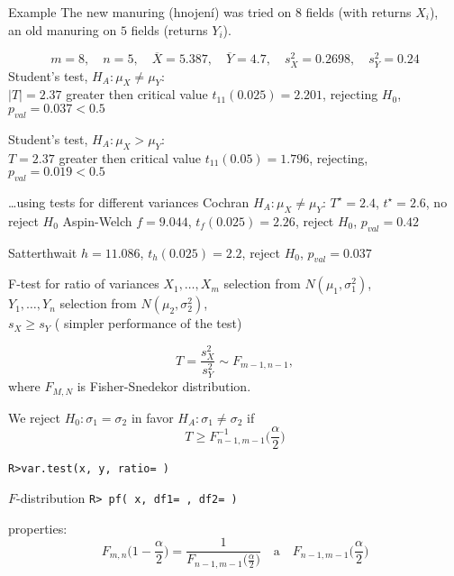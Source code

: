 \documentclass[smaller]{beamer}
\def\abs#1{\lvert#1\rvert}
\def\ol#1{\overline{#1}}
\def\blue#1{{\usebeamercolor[fg]{my blue} #1}}
\def\xskip{{\vspace{2ex}}}
\def\cz#1{{\small (#1)}}
\begin{document}
\begin{frame}{Example}
The new manuring \cz{hnojení} was tried on $8$ fields (with returns $X_i$),\\ 
an old manuring on $5$ fields (returns $Y_i$).

\[
 m=8,\quad n=5,\quad \ol{X}=5.387,\quad \ol{Y}=4.7,\quad s_X^2=0.2698,\quad s_Y^2=0.24
\]
Student's test, $H_A: \mu_X\ne \mu_Y$: \\
$\abs{T}=2.37$ greater then critical value $t_{11}(0.025) =2.201$, rejecting $H_0$, $p_{val} = 0.037 < 0.5$

\xskip
Student's test,  $H_A: \mu_X > \mu_Y$: \\
$T=2.37$ greater then critical value $t_{11}(0.05) =1.796$, rejecting, $p_{val} = 0.019 < 0.5$
\end{frame}

\begin{frame}{\dots using tests for different variances}
Cochran $H_A:  \mu_X\ne \mu_Y$:
$T^{\star} = 2.4$, $t^{\star} = 2.6$, no reject $H_0$
\xskip
Aspin-Welch $f=9.044$, $t_f(0.025) = 2.26$, reject $H_0$, $p_{val} = 0.42$

\xskip
Satterthwait $h=11.086$, $t_h(0.025) =2.2$, reject $H_0$, $p_{val} = 0.037 $

\end{frame}




\begin{frame}[fragile]{F-test for ratio of variances }
$X_1, \dots ,X_m$ selection from $N(\mu_1,\sigma_1^2)$,\\
$Y_1, \dots ,Y_n$ selection from  $N(\mu_2,\sigma_2^2)$,\\
$s_X \ge s_Y$ ( simpler performance of the test)

\[
  T=\frac{s_X^2}{s_Y^2} \sim F_{m-1,n-1},
\]
where $F_{M,N}$ is  Fisher-Snedekor distribution.

We reject $H_0:\sigma_1 = \sigma_2$ in favor  $H_A: \sigma_1\ne\sigma_2$ if 
\[
  T \ge F^{-1}_{n-1,m-1}\Big(\frac{\alpha}{2}\Big)
\]

\verb'R>var.test(x, y, ratio= )'
\end{frame}

\begin{frame}[fragile]{$F$-distribution}
\verb'R> pf( x, df1= , df2= )'

\xskip
\blue{properties:}
\[
 F_{m,n}\Big(1-\frac{\alpha}{2}\Big) = \frac{1}{F_{n-1,m-1}\big(\frac{\alpha}{2}\big)}
 \quad\text{a}\quad
 F_{n-1,m-1}\Big(\frac{\alpha}{2}\Big)
\]
\end{frame}
\end{document}
